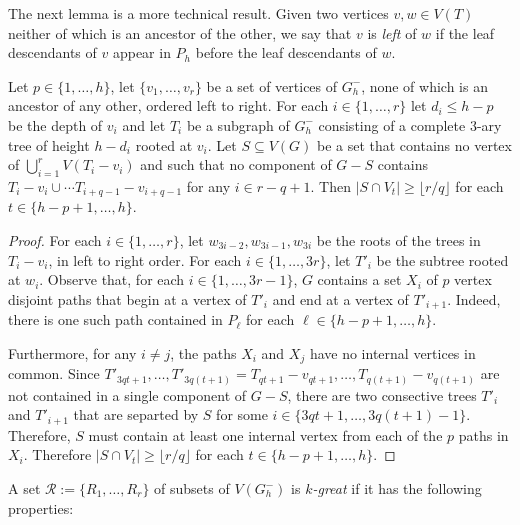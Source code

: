 \documentclass{patmorin}
\newcommand{\defin}[1]{\emph{\color{brightmaroon}#1}}
\begin{document}


The next lemma is a more technical result.  Given two vertices $v,w\in V(T)$ neither of which is an ancestor of the other, we say that $v$ is \defin{left} of $w$ if the leaf descendants of $v$ appear in $P_h$ before the leaf descendants of $w$.

\begin{lem}\label{subtree_splitting}
  Let $p\in\{1,\ldots,h\}$, let $\{v_1,\ldots,v_r\}$ be a set of vertices of $G_h^-$, none of which is an ancestor of any other, ordered left to right.  For each $i\in\{1,\ldots,r\}$ let $d_i\le h-p$ be the depth of $v_i$ and let $T_i$ be a subgraph of $G_h^-$ consisting of a complete $3$-ary tree of height $h-d_i$ rooted at $v_i$.  Let $S\subseteq V(G)$ be a set that contains no vertex of $\bigcup_{i=1}^r V(T_i-v_i)$ and such that no component of $G-S$ contains $T_i-v_i\cup\cdots T_{i+q-1}-v_{i+q-1}$ for any $i\in r-q+1$.  Then $|S\cap V_t|\ge \lfloor r/q\rfloor$ for each $t\in\{h-p+1,\ldots,h\}$.
\end{lem}

\begin{proof}
  For each $i\in\{1,\ldots,r\}$, let $w_{3i-2},w_{3i-1},w_{3i}$ be the roots of the trees in $T_i-v_i$, in left to right order.  For each $i\in\{1,\ldots,3r\}$, let $T'_i$ be the subtree rooted at $w_i$.  Observe that, for each $i\in\{1,\ldots,3r-1\}$, $G$ contains a set $X_{i}$ of $p$ vertex disjoint paths that begin at a vertex of $T'_{i}$ and end at a vertex of $T'_{i+1}$.  Indeed, there is one such path contained in $P_\ell$ for each $\ell\in\{h-p+1,\ldots,h\}$.

  Furthermore, for any $i\neq j$, the paths $X_i$ and $X_j$ have no internal vertices in common.  Since $T'_{3qt+1},\ldots,T'_{3q(t+1)}=T_{qt+1}-v_{qt+1},\ldots,T_{q(t+1)}-v_{q(t+1)}$ are not contained in a single component of $G-S$, there are two consective trees $T'_i$ and $T'_{i+1}$ that are separted by $S$ for some $i\in\{3qt+1,\ldots,3q(t+1)-1\}$.  Therefore, $S$ must contain at least one internal vertex from each of the $p$ paths in $X_{i}$.  Therefore $|S\cap V_t|\ge \lfloor r/q\rfloor$ for each $t\in\{h-p+1,\ldots,h\}$.
\end{proof}

A set $\mathcal{R}:=\{R_1,\ldots,R_r\}$ of subsets of $V(G_h^-)$ is \defin{$k$-great} if it has the following properties:
\end{document}
